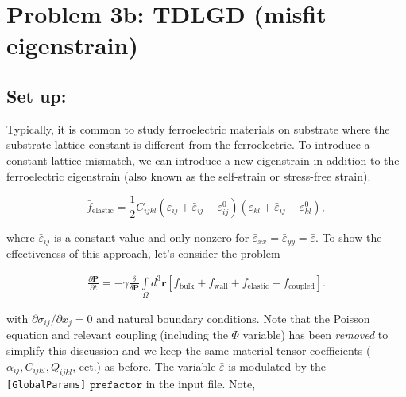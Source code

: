 \documentclass[paper=a4, fontsize=14pt]{scrartcl} %
\numberwithin{equation}{section} %
\numberwithin{figure}{section} %
\numberwithin{table}{section} %
\begin{document}
\newpage

\vspace*{-65pt}

\section*{Problem 3b: TDLGD \hspace*{-4pt}(misfit eigenstrain)}

\vspace*{-10pt}

\subsection*{Set up:}

Typically, it is common to study ferroelectric materials on substrate where the substrate lattice constant is different from the ferroelectric. To introduce a constant lattice mismatch, we can introduce a new eigenstrain in addition to the ferroelectric eigenstrain (also known as the self-strain or stress-free strain).

$$\bar{f}_\mathrm{elastic} = \frac{1}{2} C_{ijkl} \left( \varepsilon_{ij} + \bar{\varepsilon}_{ij} - \varepsilon_{ij}^0\right)\left( \varepsilon_{kl} + \bar{\varepsilon}_{ij} - \varepsilon_{kl}^0 \right),$$

where $\bar{\varepsilon}_{ij}$ is a constant value and only nonzero for $\bar{\varepsilon}_{xx} =  \bar{\varepsilon}_{yy}  = \bar{\varepsilon}$. To show the effectiveness of this approach, let's consider the problem

\begin{align}\nonumber
\frac{\partial \textbf{P}}{\partial t} =  - \gamma \frac{\delta}{\delta \textbf{P}} \int\limits_\Omega d^3 \textbf{r} \left[ f_\mathrm{bulk} +  f_\mathrm{wall}  + f_\mathrm{elastic} + f_\mathrm{coupled}\right]. 
\end{align}

with $\partial \sigma_{ij} /\partial x_j = 0$ and natural boundary conditions. Note that the Poisson equation and relevant coupling (including the $\Phi$ variable) has been \emph{removed} to simplify this discussion and we keep the same material tensor coefficients ($\alpha_{ij}, C_{ijkl}, Q_{ijkl}$, ect.) as before. The variable $\bar{\varepsilon}$ is modulated by the \texttt{[GlobalParams]} $\texttt{prefactor}$ in the input file. Note, 
\end{document}
